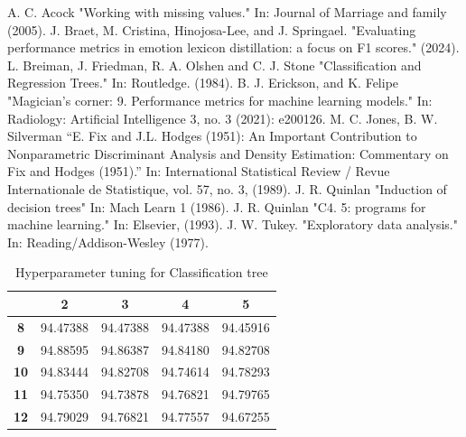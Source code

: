 \documentclass[10pt, conference]{IEEEtran}
\begin{document}
\begin{thebibliography}{00}
     A. C. Acock "Working with missing values." In: Journal of Marriage and family (2005).
     J. Braet, M. Cristina, Hinojosa-Lee, and J. Springael. "Evaluating performance metrics in emotion lexicon distillation: a focus on F1 scores." (2024).
     L. Breiman, J. Friedman, R. A. Olshen and C. J. Stone "Classification and Regression Trees." In: Routledge.  (1984).
     B. J. Erickson, and K. Felipe "Magician’s corner: 9. Performance metrics for machine learning models." In: Radiology: Artificial Intelligence 3, no. 3 (2021): e200126.
     M. C. Jones, B. W. Silverman “E. Fix and J.L. Hodges (1951): An Important Contribution to Nonparametric Discriminant Analysis and Density Estimation: Commentary on Fix and Hodges (1951).” In: International Statistical Review / Revue Internationale de Statistique, vol. 57, no. 3, (1989).
     J. R. Quinlan "Induction of decision trees" In: Mach Learn 1 (1986).
     J. R. Quinlan "C4. 5: programs for machine learning." In: Elsevier, (1993).
     J. W. Tukey. "Exploratory data analysis." In: Reading/Addison-Wesley (1977).
\end{thebibliography}


\printglossary[type=\acronymtype]

\begin{table}[h!]
    \caption{Hyperparameter tuning for Classification tree}
    \begin{center}
        \begin{tabular}{|c||c|c|c|c|}
                        & \textbf{2} & \textbf{3} & \textbf{4} & \textbf{5} \\
            \hline
            \textbf{8}  & 94.47388 & 94.47388 & 94.47388 & 94.45916\\
            \textbf{9}  & 94.88595 & 94.86387 & 94.84180 & 94.82708\\
            \textbf{10} & 94.83444 & 94.82708 & 94.74614 & 94.78293\\
            \textbf{11} & 94.75350 & 94.73878 & 94.76821 & 94.79765\\
            \textbf{12} & 94.79029 & 94.76821 & 94.77557 & 94.67255\\
        \end{tabular}
    \end{center}
\end{table}
\end{document}
